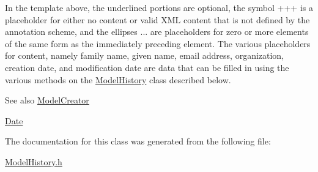In the template above, the underlined portions are optional, the symbol +++ is a placeholder for either no content or valid X\+ML content that is not defined by the annotation scheme, and the ellipses ... are placeholders for zero or more elements of the same form as the immediately preceding element. The various placeholders for content, namely family name, given name, email address, organization, creation date, and modification date are data that can be filled in using the various methods on the \hyperlink{class_model_history}{Model\+History} class described below.

\begin{DoxySeeAlso}{See also}
\hyperlink{class_model_creator}{Model\+Creator} 

\hyperlink{class_date}{Date} 
\end{DoxySeeAlso}


The documentation for this class was generated from the following file\+:\begin{DoxyCompactItemize}
\item 
\hyperlink{_model_history_8h}{Model\+History.\+h}\end{DoxyCompactItemize}
